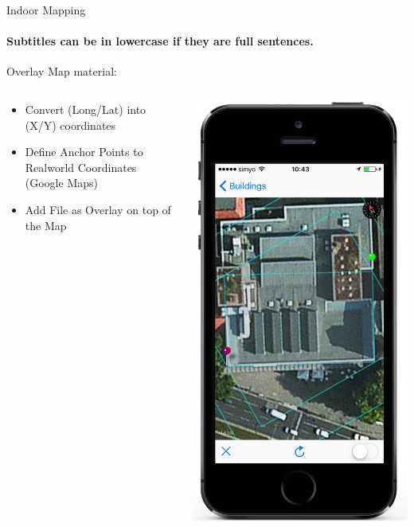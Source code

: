 \documentclass[11pt]{beamer}
\begin{document}
\begin{frame}{Indoor Mapping}

\framesubtitle{Subtitles can be in lowercase if they are full sentences.}
Overlay Map material:

  \begin{columns}[T]
  \begin{column}{.6\textwidth}
  \begin{itemize}
    \item Convert (Long/Lat) into (X/Y) coordinates
    \item Define Anchor Points to Realworld Coordinates (Google Maps)
    \item Add File as Overlay on top of the Map
  \end{itemize}
  \end{column}
  \begin{column}{.4\textwidth}
  \includegraphics[scale=0.25]{mapfirststep}

\end{column}
\end{columns}
\end{frame}
\end{document}
